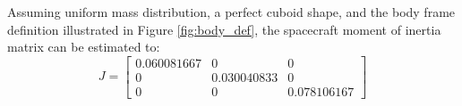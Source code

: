 Assuming uniform mass distribution, a perfect cuboid shape, and the body frame definition illustrated in Figure \ref{fig:body_def}, the spacecraft moment of inertia matrix can be estimated to:
\begin{equation}
  J = \begin{bmatrix}
    0.060081667 &	0	& 0 \\
    0 &	0.030040833 &	0 \\
    0 &	0 &	0.078106167
  \end{bmatrix} 
\end{equation}
 

